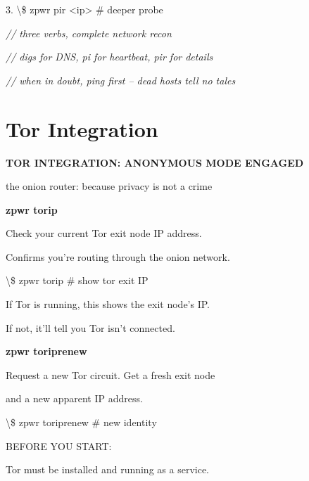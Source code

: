 \documentclass[11pt,a4paper,twoside]{book}
\begin{document}
3. \textbackslash{}\$ zpwr pir <ip>                 \# deeper probe

{\small\itshape\color{dimtext} // three verbs, complete network recon}

{\small\itshape\color{dimtext} // digs for DNS, pi for heartbeat, pir for details}

{\small\itshape\color{dimtext} // when in doubt, ping first -- dead hosts tell no tales}


\vspace{16pt}

\section{Tor Integration}


\vspace{10pt}
{\large\bfseries\color{neoncyan} TOR INTEGRATION: ANONYMOUS MODE ENGAGED}\vspace{6pt}

the onion router: because privacy is not a crime


\vspace{12pt}
{\bfseries\color{neonyellow} zpwr torip}\vspace{4pt}

Check your current Tor exit node IP address.

Confirms you're routing through the onion network.

\begin{codebox}
\textbackslash{}\$ zpwr torip                  \# show tor exit IP\\
\end{codebox}

If Tor is running, this shows the exit node's IP.

If not, it'll tell you Tor isn't connected.


\vspace{12pt}
{\bfseries\color{neonyellow} zpwr toriprenew}\vspace{4pt}

Request a new Tor circuit. Get a fresh exit node

and a new apparent IP address.

\begin{codebox}
\textbackslash{}\$ zpwr toriprenew             \# new identity\\
\end{codebox}

BEFORE YOU START:

Tor must be installed and running as a service.
\end{document}
